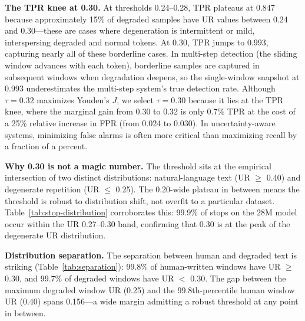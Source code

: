 \documentclass[11pt]{article}
\begin{document}
\textbf{The TPR knee at 0.30.} At thresholds 0.24--0.28, TPR plateaus at 0.847 because approximately 15\% of degraded samples have UR values between 0.24 and 0.30---these are cases where degeneration is intermittent or mild, interspersing degraded and normal tokens. At 0.30, TPR jumps to 0.993, capturing nearly all of these borderline cases. In multi-step detection (the sliding window advances with each token), borderline samples are captured in subsequent windows when degradation deepens, so the single-window snapshot at 0.993 underestimates the multi-step system's true detection rate. Although $\tau=0.32$ maximizes Youden's $J$, we select $\tau=0.30$ because it lies at the TPR knee, where the marginal gain from 0.30 to 0.32 is only 0.7\% TPR at the cost of a 25\% relative increase in FPR (from 0.024 to 0.030). In uncertainty-aware systems, minimizing false alarms is often more critical than maximizing recall by a fraction of a percent.

\textbf{Why 0.30 is not a magic number.} The threshold sits at the empirical intersection of two distinct distributions: natural-language text (UR $\ge$ 0.40) and degenerate repetition (UR $\le$ 0.25). The 0.20-wide plateau in between means the threshold is robust to distribution shift, not overfit to a particular dataset. Table~\ref{tab:stop-distribution} corroborates this: 99.9\% of stops on the 28M model occur within the UR 0.27--0.30 band, confirming that 0.30 is at the peak of the degenerate UR distribution.

\begin{table}[t]
\centering
\caption{Stop-trigger UR distribution on TinyStories 28M ($N$=1000). 96.4\% of stops are UR-triggered within 0.25--0.29; the remaining 3.6\% are triggered by auxiliary signals at UR=0.31.}
\label{tab:stop-distribution}
\end{table}

\textbf{Distribution separation.} The separation between human and degraded text is striking (Table~\ref{tab:separation}): 99.8\% of human-written windows have UR $\ge$ 0.30, and 99.7\% of degraded windows have UR $<$ 0.30. The gap between the maximum degraded window UR (0.25) and the 99.8th-percentile human window UR (0.40) spans 0.156---a wide margin admitting a robust threshold at any point in between.
\end{document}
